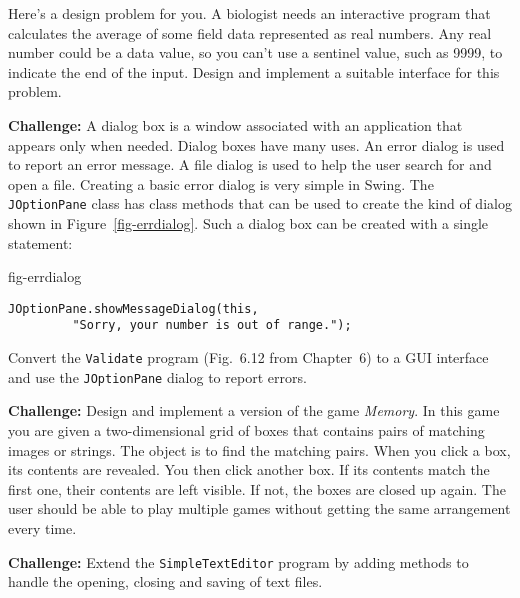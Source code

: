 \begin{EXRtwo}
\item  Here's a design problem for you. A biologist needs an
interactive program that calculates the average of some field data
represented as real numbers. Any real number could be a data value, so
you can't use a sentinel value, such as 9999, to indicate the end of
the input. Design and implement a suitable interface for this problem.

\item  {\bf Challenge:} A dialog box is a window associated
with an application that appears only when needed. Dialog boxes have
many uses. An error dialog is used to report an error message.  A file
dialog is used to help the user search for and open a file. Creating a
basic error dialog is very simple in Swing. The {\tt JOptionPane}
class has class methods that can be used to create the kind of dialog
shown in Figure~\ref{fig-errdialog}. Such a dialog box can be created
with a single statement:

{fig-errdialog}

\begin{jjjlisting}
\begin{lstlisting}
JOptionPane.showMessageDialog(this, 
         "Sorry, your number is out of range.");
\end{lstlisting}
\end{jjjlisting}

\noindent Convert the {\tt Validate} program (Fig.~6.12 from
Chapter~6) to a GUI interface and use the {\tt JOptionPane} dialog to
report errors.


\item  {\bf Challenge:} Design and implement a version of the
game {\it Memory}.  In this game you are given a two-dimensional grid
of boxes that contains pairs of matching images or strings. The object
is to find the matching pairs. When you click a box, its contents
are revealed. You then click another box. If its contents match the
first one, their contents are left visible.  If not, the boxes are
closed up again. The user should be able to play multiple games
without getting the same arrangement every time.

\item {\bf Challenge:} Extend the {\tt SimpleTextEditor} program by
adding methods to handle the opening, closing and saving of text
files.

\end{EXRtwo}
